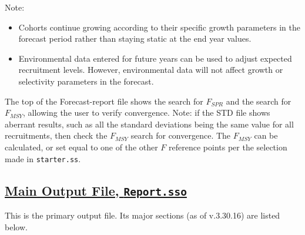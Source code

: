 Note:
\begin{itemize}
	\item Cohorts continue growing according to their specific growth parameters in the forecast period rather than staying static at the end year values.
	\item Environmental data entered for future years can be used to adjust expected recruitment levels. However, environmental data will not affect growth or selectivity parameters in the forecast.
\end{itemize}

The top of the Forecast-report file shows the search for $F_{SPR}$ and the search for $F_{MSY}$, allowing the user to verify convergence. Note: if the STD file shows aberrant results, such as all the standard deviations being the same value for all recruitments, then check the $F_{MSY}$ search for convergence. The $F_{MSY}$ can be calculated, or set equal to one of the other $F$ reference points per the selection made in \texttt{starter.ss}.

\hypertarget{MainOutput}{}
\subsection[Main Output File, \texttt{Report.sso}]{\protect\hyperlink{MainOutput}{Main Output File, \texttt{Report.sso}}}
This is the primary output file. Its major sections (as of v.3.30.16) are listed below.  

